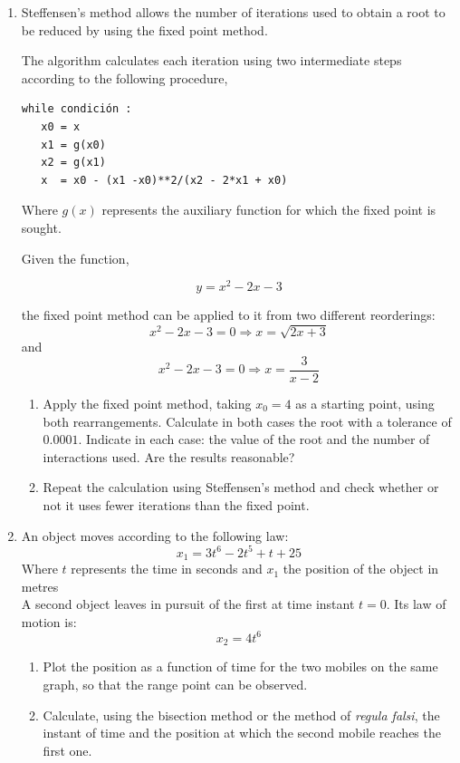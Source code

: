 \begin{enumerate}
\item Steffensen's method allows the number of iterations used to obtain a root to be reduced by using the fixed point method.

The algorithm calculates each iteration using two intermediate steps according to the following procedure,

\begin{verbatim}
while condición : 
   x0 = x
   x1 = g(x0)
   x2 = g(x1)
   x  = x0 - (x1 -x0)**2/(x2 - 2*x1 + x0)
\end{verbatim}

Where $g(x)$ represents the auxiliary function for which the fixed point is sought.


Given the function,

\begin{equation*}
y= x^2-2x-3
\end{equation*} 

the fixed point method can be applied to it from two different reorderings:
\begin{equation}
x^2-2x-3=0 \Rightarrow x=\sqrt{2x+3}
\end{equation}
and
\begin{equation}
x^2-2x-3=0 \Rightarrow x=\frac{3}{x-2}
\end{equation}
\begin{enumerate}
\item Apply the fixed point method, taking $x_0=4$ as a starting point, using both rearrangements. Calculate in both cases the root with a tolerance of $0.0001$. Indicate in each case: the value of the root and the number of interactions used. Are the results reasonable?

\item Repeat the calculation using Steffensen's method and check whether or not it uses fewer iterations than the fixed point.
\end{enumerate}

\item An object moves according to the following law:
\begin{equation}
x_1 = 3t^6 - 2t^5 + t + 25
\end{equation}
Where $t$ represents the time in seconds and $x_1$ the position of the object in metres \\
 A second object leaves in pursuit of the first at time instant $t=0$. Its law of motion is:
\begin{equation}
x_2 = 4t^6
\end{equation}
\begin{enumerate}
\item Plot the position as a function of time for the two mobiles on the same graph, so that the range point can be observed.  
\item Calculate, using the bisection method or the method of \emph{regula falsi}, the instant of time and the position at which the second mobile reaches the first one.
\end{enumerate}


\end{enumerate}
